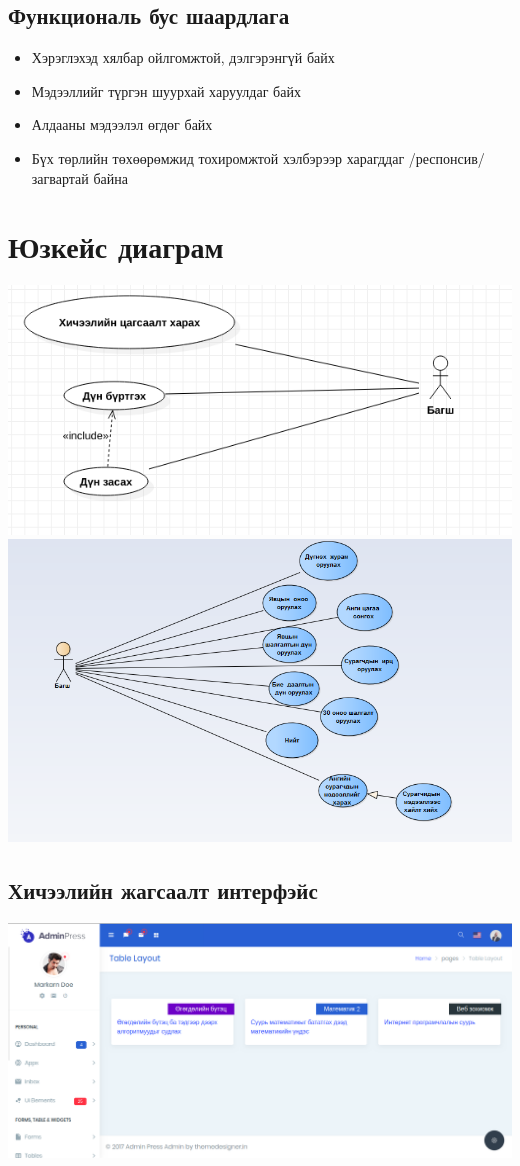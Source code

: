 \documentclass[
oneside, %
english, %
onehalfspacing, %
nolistspacing, %
headsepline, %
]{article} %
\begin{document}
	\subsection{Функциональ бус шаардлага}
	\begin{itemize}
		\item Хэрэглэхэд хялбар ойлгомжтой, дэлгэрэнгүй байх
		\item Мэдээллийг түргэн шуурхай харуулдаг байх
		\item Алдааны мэдээлэл өгдөг байх 
		\item Бүх төрлийн төхөөрөмжид тохиромжтой хэлбэрээр харагддаг /респонсив/ загвартай байна
	\end{itemize}
	\section{Юзкейс диаграм}
     \includegraphics[width=\textwidth]{bagsh}
     \includegraphics[width=\textwidth]{Usecase2}
     	\subsection{Хичээлийн жагсаалт интерфэйс}
     \includegraphics[width=\textwidth]{course_list}
\end{document}
